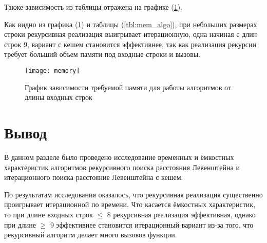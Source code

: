 Также зависимость из таблицы отражена на графике (\ref{fig:mem_graph}).

Как видно из графика (\ref{fig:mem_graph}) и таблицы (\ref{tbl:mem_algo}), при небольших размерах строки рекурсивная реализация выигрывает итерационную, одна начиная с длин строк 9, вариант с кешем становится эффективнее, так как реализация рекурсии требует больший объем памяти под входные строки и вызовы.
\begin{figure}
	\centering
	\texttt{[image: memory]}
	\caption{График зависимости требуемой памяти для работы алгоритмов от длины входных строк}
	\label{fig:mem_graph}
\end{figure}

\pagebreak

\section{Вывод}

В данном разделе было проведено исследование временных и ёмкостных характеристик алгоритмов рекурсивного поиска расстояния Левенштейна и итерационного поиска расстояние Левенштейна с кешем.

По результатам исследования оказалось, что рекурсивная реализация существенно проигрывает итерационной по времени. Что касается ёмкостных характеристик, то при длине входных строк $\leq$ 8 рекурсивная реализация эффективная, однако при длине $\geq$ 9 эффективнее становится итерационный вариант из-за того, что рекурсивный алгоритм делает много вызовов функции.

\clearpage

